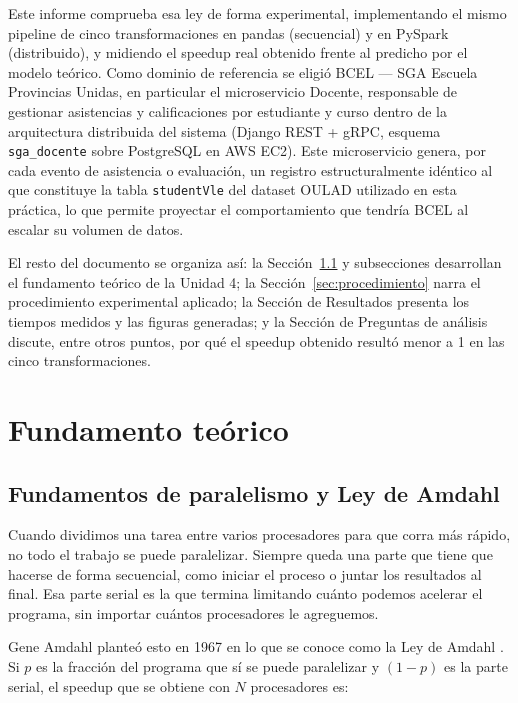 \documentclass[11pt,a4paper]{article}
\begin{document}
Este informe comprueba esa ley de forma experimental, implementando el mismo
pipeline de cinco transformaciones en pandas (secuencial) y en PySpark
(distribuido), y midiendo el speedup real obtenido frente al predicho por el
modelo teórico. Como dominio de referencia se eligió BCEL --- SGA Escuela
Provincias Unidas, en particular el microservicio Docente, responsable de
gestionar asistencias y calificaciones por estudiante y curso dentro de la
arquitectura distribuida del sistema (Django REST + gRPC, esquema
\texttt{sga\_docente} sobre PostgreSQL en AWS EC2). Este microservicio genera,
por cada evento de asistencia o evaluación, un registro estructuralmente
idéntico al que constituye la tabla \texttt{studentVle} del dataset OULAD
utilizado en esta práctica, lo que permite proyectar el comportamiento que
tendría BCEL al escalar su volumen de datos.

El resto del documento se organiza así: la Sección~\ref{sec:amdahl} y
subsecciones desarrollan el fundamento teórico de la Unidad 4; la
Sección~\ref{sec:procedimiento} narra el procedimiento experimental aplicado;
la Sección de Resultados presenta los tiempos medidos y las figuras generadas;
y la Sección de Preguntas de análisis discute, entre otros puntos, por qué el
speedup obtenido resultó menor a 1 en las cinco transformaciones.

\section{Fundamento teórico}

\subsection{Fundamentos de paralelismo y Ley de Amdahl}
\label{sec:amdahl}
Cuando dividimos una tarea entre varios procesadores para que corra más
rápido, no todo el trabajo se puede paralelizar. Siempre queda una parte
que tiene que hacerse de forma secuencial, como iniciar el proceso o juntar
los resultados al final. Esa parte serial es la que termina limitando
cuánto podemos acelerar el programa, sin importar cuántos procesadores le
agreguemos.

Gene Amdahl planteó esto en 1967 en lo que se conoce como la Ley de Amdahl
\cite{amdahl1967}. Si $p$ es la fracción del programa que sí se puede
paralelizar y $(1-p)$ es la parte serial, el speedup que se obtiene con $N$
procesadores es:
\end{document}
